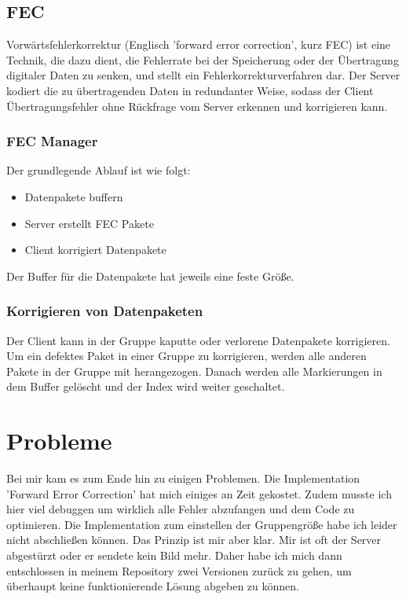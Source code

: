 \documentclass{scrartcl}
\begin{document}
\subsection{FEC}
Vorwärtsfehlerkorrektur (Englisch 'forward error correction', kurz FEC) ist eine Technik, die dazu dient, die Fehlerrate bei der Speicherung oder der Übertragung digitaler Daten zu senken, und stellt ein Fehlerkorrekturverfahren dar. Der Server kodiert die zu übertragenden Daten in redundanter Weise, sodass der Client Übertragungsfehler ohne Rückfrage vom Server erkennen und korrigieren kann.

\subsubsection*{FEC Manager}
Der grundlegende Ablauf ist wie folgt:
\begin{itemize}
	\item Datenpakete buffern
	\item Server erstellt FEC Pakete
	\item Client korrigiert Datenpakete
\end{itemize}
Der Buffer für die Datenpakete hat jeweils eine feste Größe.

\subsubsection*{Korrigieren von Datenpaketen}
Der Client kann in der Gruppe kaputte oder verlorene Datenpakete korrigieren. Um ein defektes Paket in einer Gruppe zu korrigieren, werden alle anderen Pakete in der Gruppe mit herangezogen. Danach werden alle Markierungen in dem Buffer gelöscht und der Index wird weiter geschaltet.
\newpage
\section{Probleme}
Bei mir kam es zum Ende hin zu einigen Problemen. Die Implementation 'Forward Error Correction' hat mich einiges an Zeit gekostet. Zudem musste ich hier viel debuggen um wirklich alle Fehler abzufangen und dem Code zu optimieren. Die Implementation zum einstellen der Gruppengröße habe ich leider nicht abschließen können. Das Prinzip ist mir aber klar. Mir ist oft der Server abgestürzt oder er sendete kein Bild mehr. Daher habe ich mich dann entschlossen in meinem Repository zwei Versionen zurück zu gehen, um überhaupt keine funktionierende Lösung abgeben zu können. 
\end{document}
